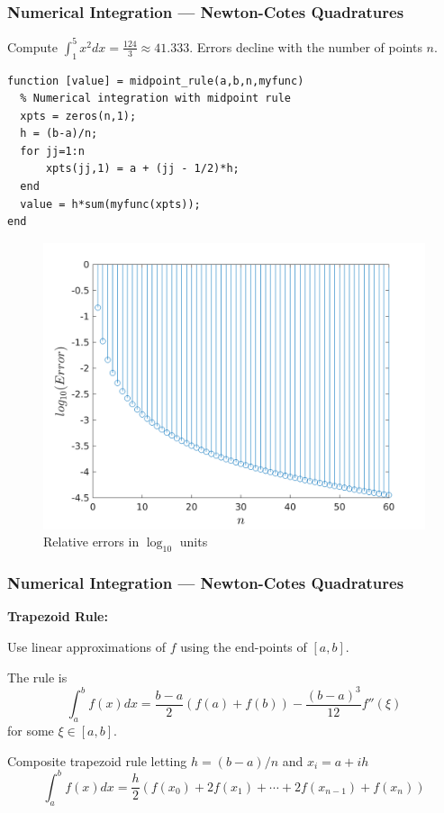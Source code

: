 \documentclass[11pt,xcolor={svgnames},aspectratio=169,usepdftitle=false]{beamer}
\let\toneitemize\itemize
\let\ttwoitemize\enditemize
\renewenvironment{itemize}{\toneitemize\addtolength{\itemsep}{0.7\baselineskip}}{\ttwoitemize}
\begin{document}
\begin{frame}[fragile]
  \frametitle{Numerical Integration --- Newton-Cotes Quadratures}
\begin{example}
Compute $\int^5_1 x^2 dx = \frac{124}{3}\approx 41.333$. Errors decline with the number of points $n$.
\end{example}
\begin{minipage}{0.45\textwidth}
\begin{lstlisting}
function [value] = midpoint_rule(a,b,n,myfunc)
  % Numerical integration with midpoint rule
  xpts = zeros(n,1);
  h = (b-a)/n;
  for jj=1:n 
      xpts(jj,1) = a + (jj - 1/2)*h;
  end
  value = h*sum(myfunc(xpts));
end
\end{lstlisting}
\end{minipage}
\begin{minipage}{0.54\textwidth}
  \begin{figure}
    \centering
    \includegraphics[width=\textwidth]{../figures/errors_midpointrule.png}
    \caption{Relative errors in $\log_{10}$ units}
  \end{figure}
\end{minipage}
\end{frame}

\begin{frame}
  \frametitle{Numerical Integration --- Newton-Cotes Quadratures}
  \alert{\textbf{Trapezoid Rule:}}
\begin{itemize}
  \item Use linear approximations of $f$ using the end-points of $[a,b]$.
  \item The rule is
  \[
  \int^b_a f(x)  dx = \frac{b-a}{2}(f(a) + f(b)) - \frac{(b - a)^3}{12}f''(\xi)
  \]
  for some $\xi\in [a,b]$.
  \item Composite trapezoid rule letting $h = (b-a)/n$ and $x_i = a + ih$
  \[
  \int^b_a f(x)dx = \frac{h}{2}\left(f(x_0) + 2f(x_1) + \cdots + 2f(x_{n-1}) + f(x_n)\right)
  \]
\end{itemize}
\end{frame}
\end{document}
